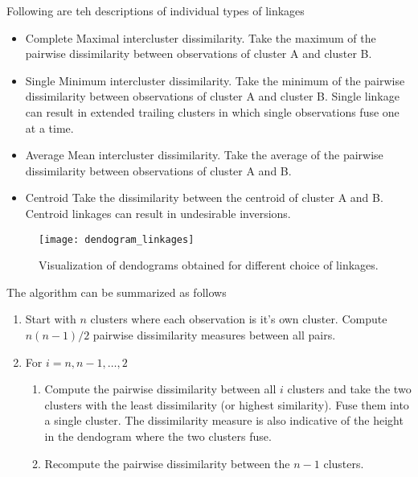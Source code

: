 \documentclass[../statistical_learning_notes.tex]{subfiles}
\begin{document}
    Following are teh descriptions of individual types of linkages
    \begin{itemize}
         \item Complete\newline
         Maximal intercluster dissimilarity. Take the maximum of the pairwise dissimilarity between observations of cluster A and cluster B.
         \item Single\newline
         Minimum intercluster dissimilarity. Take the minimum of the pairwise dissimilarity between observations of cluster A and cluster B.\newline
         Single linkage can result in extended trailing clusters in which single observations fuse one at a time.
         \item Average\newline
         Mean intercluster dissimilarity. Take the average of the pairwise dissimilarity between observations of cluster A and B.
         \item Centroid\newline
         Take the dissimilarity between the centroid of cluster A and B. Centroid linkages can result in undesirable inversions.
    \end{itemize}


    \begin{figure}[h]
    \texttt{[image: dendogram\_linkages]}
    \centering
    \caption{Visualization of dendograms obtained for different choice of linkages.}
    \label{fig:dendogram_linkages} %
    \end{figure}

    The algorithm can be summarized as follows
    \begin{enumerate}
        \item Start with $n$ clusters where each observation is it's own cluster. Compute $n(n-1)/2$ pairwise dissimilarity measures between all pairs.
        \item For $i=n, n-1, \ldots, 2$
        \begin{enumerate}
            \item Compute the pairwise dissimilarity between all $i$ clusters and take the two clusters with the least dissimilarity (or highest similarity). Fuse them into a single cluster. The dissimilarity measure is also indicative of the height in the dendogram where the two clusters fuse.
            \item Recompute the pairwise dissimilarity between the $n-1$ clusters.
        \end{enumerate}
    \end{enumerate}
\end{document}
